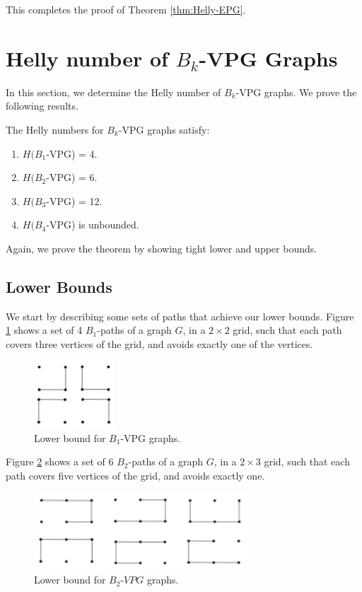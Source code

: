 This completes the proof of Theorem \ref{thm:Helly-EPG}. 


\section{Helly number of $B_k$-VPG Graphs}\label{sec:HellynumberVPG}

In this section, we determine the Helly number of $B_k$-VPG graphs. We prove the following results.
\begin{theorem}\label{thm:Bk-VPG}
The Helly numbers for $B_k$-VPG graphs satisfy:
\begin{enumerate}
\item $H(B_1$-VPG) = 4.
\item $H(B_2$-VPG) = 6.
\item $H(B_3$-VPG) = 12.
\item $H(B_4$-VPG) is unbounded.
\end{enumerate}
\end{theorem}

Again, we prove the theorem by showing tight lower and upper bounds.

\subsection{Lower Bounds}

We start by describing some sets of paths that achieve our lower bounds. 
Figure \ref{VPG:lower-B1} shows a set of 4 $B_1$-paths of a graph $G$, in a $2 \times 2$ grid, such that each path covers three vertices of the grid, and avoids exactly one of the vertices. 

\begin{figure}[!h]
    \centering
    \includegraphics[width=3cm]{./img/lower-bound-B1-VPG.pdf}
    \caption{Lower bound for $B_1$-VPG graphs.}
    \label{VPG:lower-B1}
\end{figure}

Figure \ref{VPG:lower-B2} shows a set of 6 $B_2$-paths of a graph $G$, in a $2 \times 3$ grid, such that each path covers five vertices of the grid, and avoids exactly one. 


\begin{figure}[!h]
    \centering
    \includegraphics[width=8cm]{./img/lower-bound-B2-VPG.pdf}
    \caption{Lower bound for $B_2$-$VPG$ graphs.}
    \label{VPG:lower-B2}
\end{figure}


